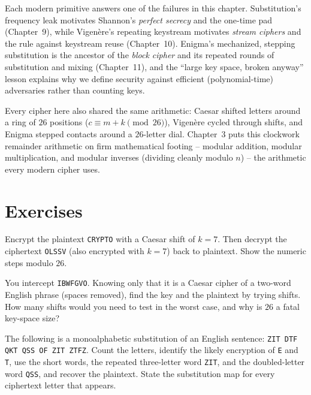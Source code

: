 \begin{connectionbox}
Each modern primitive answers one of the failures in this chapter. Substitution's frequency leak
motivates Shannon's \emph{perfect secrecy} and the one-time pad (Chapter~9), while Vigen\`ere's
repeating keystream motivates \emph{stream ciphers} and the rule against keystream reuse
(Chapter~10). Enigma's mechanized, stepping substitution is the ancestor of the \emph{block
cipher} and its repeated rounds of substitution and mixing (Chapter~11), and the ``large key
space, broken anyway'' lesson explains why we define security against efficient
(polynomial-time) adversaries rather than counting keys.

Every cipher here also shared the same arithmetic: Caesar shifted letters around a ring of $26$
positions ($c \equiv m + k \pmod{26}$), Vigen\`ere cycled through shifts, and Enigma stepped
contacts around a $26$-letter dial. Chapter~3 puts this clockwork remainder arithmetic on firm
mathematical footing -- modular addition, modular multiplication, and modular inverses (dividing
cleanly modulo $n$) -- the arithmetic every modern cipher uses.
\end{connectionbox}

\section*{Exercises}

\begin{exercise}
\label{ch02:ex-caesar}
Encrypt the plaintext \texttt{CRYPTO} with a Caesar shift of $k=7$. Then decrypt the
ciphertext \texttt{OLSSV} (also encrypted with $k=7$) back to plaintext. Show the numeric steps
modulo $26$.
\end{exercise}

\begin{exercise}
\label{ch02:ex-brute}
You intercept \texttt{IBWFGVO}. Knowing only that it is a Caesar cipher of a two-word English
phrase (spaces removed), find the key and the plaintext by trying shifts. How many shifts would
you need to test in the worst case, and why is $26$ a fatal key-space size?
\end{exercise}

\begin{exercise}
\label{ch02:ex-freq}
The following is a monoalphabetic substitution of an English sentence:
\texttt{ZIT DTF QKT QSS OF ZIT ZTFZ}. Count the letters, identify the likely encryption
of \texttt{E} and \texttt{T}, use the short words, the repeated three-letter word
\texttt{ZIT}, and the doubled-letter word \texttt{QSS}, and recover the plaintext. State the
substitution map for every ciphertext letter that appears.
\end{exercise}

